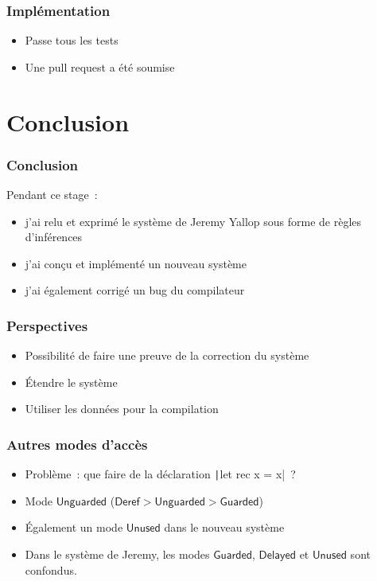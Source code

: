 \documentclass{beamer}
\newcommand{\Deref}{\mathsf{Deref}}
\newcommand{\Unguarded}{\mathsf{Unguarded}}
\newcommand{\Guarded}{\mathsf{Guarded}}
\newcommand{\Delayed}{\mathsf{Delayed}}
\newcommand{\Unused}{\mathsf{Unused}}
\newcommand{\backupbegin}{
   \newcounter{finalframe}
   \setcounter{finalframe}{\value{framenumber}}
}
\begin{document}
\begin{frame}
  \frametitle{Implémentation}
  \begin{itemize}
    \item Passe tous les tests
    \item Une pull request a été soumise
  \end{itemize}
\end{frame}
  
\section*{Conclusion}

\begin{frame}
  \frametitle{Conclusion}
  Pendant ce stage :
  \begin{itemize}
    \item j'ai relu et exprimé le système de Jeremy Yallop sous forme de règles
      d'inférences
    \item j'ai conçu et implémenté un nouveau système
    \item j'ai également corrigé un bug du compilateur
  \end{itemize}
\end{frame}

\begin{frame}
  \frametitle{Perspectives}
  \begin{itemize}
    \item Possibilité de faire une preuve de la correction du système
    \item Étendre le système
    \item Utiliser les données pour la compilation
  \end{itemize}
\end{frame}

\appendix
\backupbegin

\begin{frame}
  \frametitle{Autres modes d'accès}
  \begin{itemize}
    \item Problème : que faire de la déclaration \texttt|let rec x = x| ?
    \item<2-> Mode $\Unguarded$ ($\Deref > \Unguarded > \Guarded$)
    \item<3-> Également un mode $\Unused$ dans le nouveau système
    \item<4-> Dans le système de Jeremy, les modes $\Guarded$, $\Delayed$ et
      $\Unused$ sont confondus.
  \end{itemize}
\end{frame}
\end{document}
